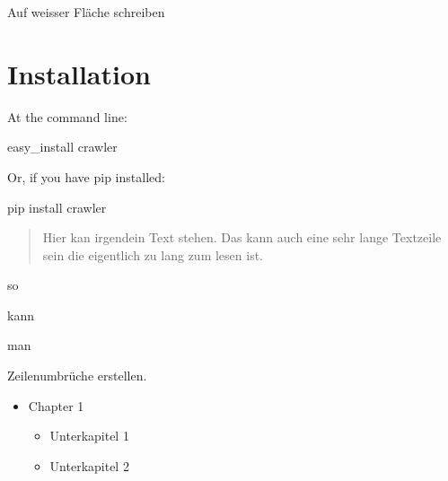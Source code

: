 \documentclass[letterpaper,10pt,english]{sphinxmanual}
\begin{document}
\sphinxAtStartPar
Auf weisser Fläche  schreiben

\begin{sphinxVerbatim}[commandchars=\\\{\}]
 

    
   

  
\end{sphinxVerbatim}

\sphinxAtStartPar
{}

\sphinxstepscope


\chapter{Installation}
\label{\detokenize{install:installation}}\label{\detokenize{install::doc}}
\sphinxAtStartPar
At the command line:

\sphinxAtStartPar
easy\_install crawler

\sphinxAtStartPar
Or, if you have pip installed:

\sphinxAtStartPar
pip install crawler
\begin{quote}

\sphinxAtStartPar
Hier kan irgendein Text stehen.
Das kann auch eine sehr lange Textzeile sein die eigentlich zu lang zum lesen ist.
\end{quote}

\begin{DUlineblock}{0em}
\item[] so
\item[] kann
\item[] man
\item[] Zeilenumbrüche erstellen.
\end{DUlineblock}
\begin{description}
\begin{itemize}
\item {} 
\sphinxAtStartPar
Chapter 1
\begin{itemize}
\item {} 
\sphinxAtStartPar
Unterkapitel 1

\item {} 
\sphinxAtStartPar
Unterkapitel 2

\end{itemize}

\end{itemize}

\end{description}
\end{document}
